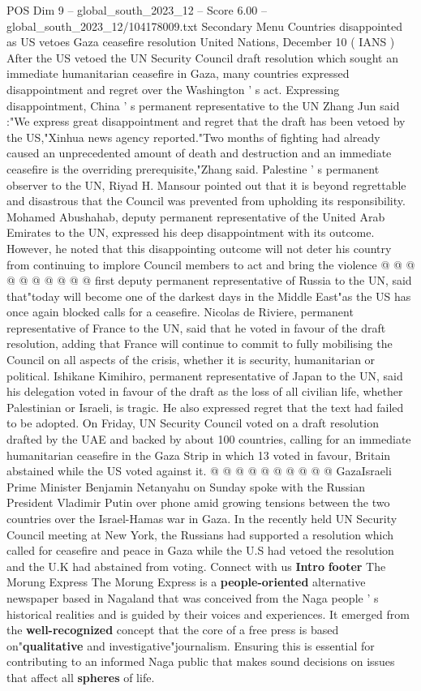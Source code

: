 \begin{textsample}{POS Dim 9 – global\_south\_2023\_12 – Score 6.00 – global\_south\_2023\_12/104178009.txt}  \label{ex:f9_pos_008}
Secondary Menu Countries disappointed as US vetoes Gaza ceasefire resolution United Nations, December 10 ( IANS ) After the US vetoed the UN Security Council draft resolution which sought an immediate humanitarian ceasefire in Gaza, many countries expressed disappointment and regret over the Washington ' s act.
Expressing disappointment, China ' s permanent representative to the UN Zhang Jun said :"We express great disappointment and regret that the draft has been vetoed by the US,"Xinhua news agency reported."Two months of fighting had already caused an unprecedented amount of death and destruction and an immediate ceasefire is the overriding prerequisite,"Zhang said.
Palestine ' s permanent observer to the UN, Riyad H.
Mansour pointed out that it is beyond regrettable and disastrous that the Council was prevented from upholding its responsibility.
Mohamed Abushahab, deputy permanent representative of the United Arab Emirates to the UN, expressed his deep disappointment with its outcome.
However, he noted that this disappointing outcome will not deter his country from continuing to implore Council members to act and bring the violence @ @ @ @ @ @ @ @ @ @ first deputy permanent representative of Russia to the UN, said that"today will become one of the darkest days in the Middle East"as the US has once again blocked calls for a ceasefire.
Nicolas de Riviere, permanent representative of France to the UN, said that he voted in favour of the draft resolution, adding that France will continue to commit to fully mobilising the Council on all aspects of the crisis, whether it is security, humanitarian or political.
Ishikane Kimihiro, permanent representative of Japan to the UN, said his delegation voted in favour of the draft as the loss of all civilian life, whether Palestinian or Israeli, is tragic.
He also expressed regret that the text had failed to be adopted.
On Friday, UN Security Council voted on a draft resolution drafted by the UAE and backed by about 100 countries, calling for an immediate humanitarian ceasefire in the Gaza Strip in which 13 voted in favour, Britain abstained while the US voted against it. @ @ @ @ @ @ @ @ @ @ GazaIsraeli Prime Minister Benjamin Netanyahu on Sunday spoke with the Russian President Vladimir Putin over phone amid growing tensions between the two countries over the Israel-Hamas war in Gaza.
In the recently held UN Security Council meeting at New York, the Russians had supported a resolution which called for ceasefire and peace in Gaza while the U.S had vetoed the resolution and the U.K had abstained from voting.
Connect with us \textbf{Intro} \textbf{footer} The Morung Express The Morung Express is a \textbf{people-oriented} alternative newspaper based in Nagaland that was conceived from the Naga people ' s historical realities and is guided by their voices and experiences.
It emerged from the \textbf{well-recognized} concept that the core of a free press is based on"\textbf{qualitative} and investigative"journalism.
Ensuring this is essential for contributing to an informed Naga public that makes sound decisions on issues that affect all \textbf{spheres} of life.


\end{textsample}
